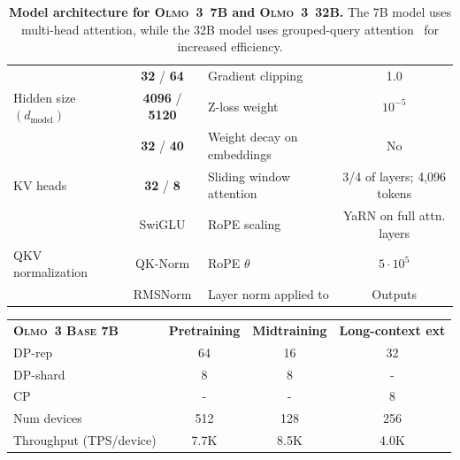 \documentclass[table]{ai2style/ai2}
\newcommand{\newOlmo}{Olmo\xspace}
\newcommand{\olmothree}{\textsc{\newOlmo~3}\xspace}
\newcommand{\olmothreebase}{\textsc{\newOlmo~3 Base}\xspace}
\begin{document}
{{\begin{table}[!h]
    \centering
    \begin{small}
    \begin{tabular}{lclc}
        \toprule
        \rowcolor{midgrey}{Layers} & \textcolor[HTML]{d3327e}{\bf{32}} / \textcolor[HTML]{00ab72}{\bf{64}} & {Gradient clipping} & 1.0 \\
        {Hidden size~$(d_\text{model})$}  & \textcolor[HTML]{d3327e}{\bf{4096}} / \textcolor[HTML]{00ab72}{\bf{5120}} & {Z-loss weight} & $10^{-5}$ \\
        \rowcolor{midgrey}{Q heads} & \textcolor[HTML]{d3327e}{\bf{32}} / \textcolor[HTML]{00ab72}{\bf{40}} & {Weight decay on embeddings} & No \\
        {KV heads} & \textcolor[HTML]{d3327e}{\bf{32}} / \textcolor[HTML]{00ab72}{\bf{8}} & {Sliding window attention} & 3/4 of layers; 4{,}096 tokens \\
        \rowcolor{midgrey}{Activation} & SwiGLU & {RoPE scaling} & YaRN on full attn. layers \\
        {QKV normalization} & QK-Norm & {RoPE $\theta$} & $5 \cdot 10^{5}$ \\
        \rowcolor{midgrey}{Layer norm} & RMSNorm & {Layer norm applied to} & Outputs \\
        \bottomrule
    \end{tabular}
    \end{small}
    \caption{\textbf{Model architecture for \textcolor[HTML]{d3327e}{\olmothree~7B} and \textcolor[HTML]{00ab72}{\olmothree~32B}.} The 7B model uses multi-head attention, while the 32B model uses grouped-query attention~\citep{ainslie2023gqatraininggeneralizedmultiquery} for increased efficiency.}
    \label{tab:combined_model_specs}
\end{table}

\begin{table}[!h]
    \centering
    \begin{small}
    \begin{tabular}{lccc}
        \toprule
        \rowcolor{ai2lightpink}  \textbf{\olmothreebase 7B} & \textbf{Pretraining} & \textbf{Midtraining} & \textbf{Long-context ext} \\[2pt]
        {DP-rep} & 64 & 16 & 32 \\
        \rowcolor{midgrey} {DP-shard} & 8 & 8 & - \\
        {CP} & - & - & 8 \\
        \rowcolor{midgrey} {Num devices} & 512 & 128 & 256 \\
        {Throughput (TPS/device)} & 7.7K & 8.5K & 4.0K \\[2pt]
        

\end{tabular}
\end{small}
\end{table}}}
\end{document}

